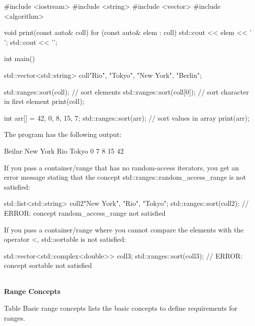 \begin{cpp}
#include <iostream>
#include <string>
#include <vector>
#include <algorithm>

void print(const auto& coll) {
	for (const auto& elem : coll) {
		std::cout << elem << ' ';
	}
	std::cout << '\n';
}

int main()
{
	std::vector<std::string> coll{"Rio", "Tokyo", "New York", "Berlin"};
	
	std::ranges::sort(coll); // sort elements
	std::ranges::sort(coll[0]); // sort character in first element
	print(coll);
	
	int arr[] = {42, 0, 8, 15, 7};
	std::ranges::sort(arr); // sort values in array
	print(arr);
}
\end{cpp}

The program has the following output:

\begin{shell}
Beilnr New York Rio Tokyo
0 7 8 15 42
\end{shell}

If you pass a container/range that has no random-access iterators, you get an error message stating that the concept std::ranges::random\_access\_range is not satisfied:

\begin{cpp}
std::list<std::string> coll2{"New York", "Rio", "Tokyo"};
std::ranges::sort(coll2); // ERROR: concept random_access_range not satisfied
\end{cpp}

If you pass a container/range where you cannot compare the elements with the operator <, std::sortable is not satisfied:

\begin{cpp}
std::vector<std::complex<double>> coll3;
std::ranges::sort(coll3); // ERROR: concept sortable not satisfied
\end{cpp}

\noindent
\hspace*{\fill} \\ %
\textbf{Range Concepts}

Table Basic range concepts lists the basic concepts to define requirements for ranges.

